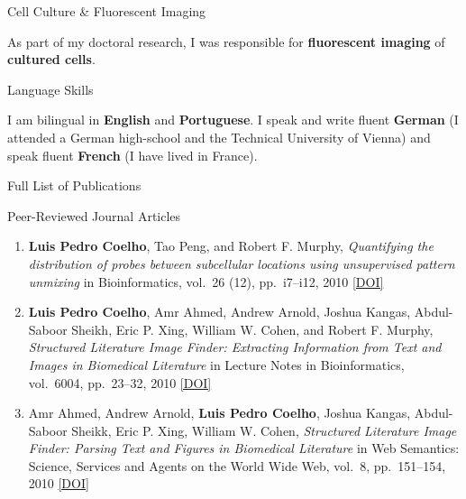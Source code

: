\documentclass{article}
\renewcommand\section[1]{%
    \par\vspace{2em}\penalty-100%
    {\subhead #1}%
    \par\penalty100\vspace{1em}\penalty100%
}
\renewcommand\subsection[1]{%
    \par\vspace{.1em}%
    {\hspace{1em}\subsubhead #1}%
    \par\vspace{.2em}%
}
\newcommand\cvitem[2][\relax]{%
    \par\vspace{.8em}
    \if\relax#1\else{\Date \textcolor{medg}{#1}}\hspace{1em}\fi%
    {\CvItem #2}%
    \par\vspace{.4em}
}
\newcommand\showdoi[1]{%
    \href{http://dx.doi.org/#1}{[DOI]}%
}
\begin{document}
\cvitem{Cell Culture \& Fluorescent Imaging}
As part of my doctoral research, I was responsible for \textbf{fluorescent
imaging} of \textbf{cultured cells}.

\cvitem{Language Skills}
I am bilingual in \textbf{English} and \textbf{Portuguese}. I speak and write
fluent \textbf{German} (I attended a German high-school and the Technical
University of Vienna) and speak fluent \textbf{French} (I have lived in
France).

\pagebreak
\section{Full List of Publications}

\subsection{Peer-Reviewed Journal Articles}
\begin{enumerate}
\item \textbf{Luis Pedro Coelho}, Tao Peng, and Robert F. Murphy,
\emph{Quantifying the distribution of probes between subcellular locations
using unsupervised pattern unmixing} in Bioinformatics, vol.\ 26 (12), pp.\
i7--i12, 2010 \showdoi{10.1093/bioinformatics/btq220}

\item \textbf{Luis Pedro Coelho}, Amr Ahmed, Andrew Arnold, Joshua Kangas,
Abdul-Saboor Sheikh, Eric P. Xing, William W. Cohen, and Robert F. Murphy,
\emph{Structured Literature Image Finder: Extracting Information from Text and
Images in Biomedical Literature} in Lecture Notes in Bioinformatics, vol.\
6004, pp.\ 23--32, 2010 \showdoi{10.1007/978-3-642-13131-8_4}

\item Amr Ahmed, Andrew Arnold, \textbf{Luis Pedro Coelho}, Joshua Kangas,
Abdul-Saboor Sheikk, Eric P. Xing, William W. Cohen, \emph{Structured
Literature Image Finder: Parsing Text and Figures in Biomedical Literature} in
Web Semantics: Science, Services and Agents on the World Wide Web, vol.\ 8,
pp.\ 151--154, 2010 \showdoi{10.1016/j.websem.2010.04.002}

\end{enumerate}
\end{document}
